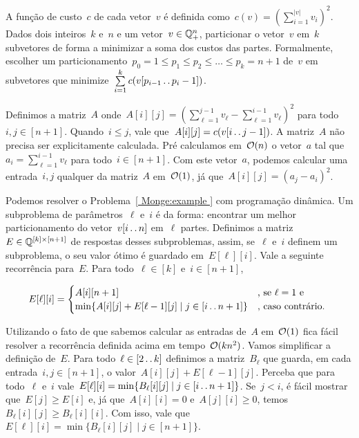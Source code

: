 \begin{prob} \label{ Monge:example }
A função de custo~$c$ de cada vetor~$v$ é definida como~$c(v) = \left( \sum\limits_{i=1}^{|v|} v_i \right)^2$. Dados dois inteiros~$k$ e~$n$ e um vetor~${ v \in \mathbb{Q}^n_+ }$, particionar o vetor~$v$ em~$k$ subvetores de forma a minimizar a soma dos custos das partes. Formalmente, escolher um particionamento~${ p_0 = 1 \leq p_1 \leq p_2 \leq \dots \leq p_k = n+1 }$ de~$v$ em subvetores que minimize~$\sum\limits_{i=1}^k c(v[p_{i-1} \,.\,.\, p_i - 1])$.
\end{prob}

Definimos a matriz~$A$ onde~${ A[i][j] = \left(\sum\limits_{\ell=1}^{j-1} v_\ell - \sum\limits_{\ell=1}^{i-1} v_\ell \right)^2 }$ para todo~${ i,j \in [n+1] }$. Quando~${ i \leq j }$, vale que~${ A[i][j] = c(v[i \,.\,.\, j-1]) }$. A matriz~$A$ não precisa ser explicitamente calculada. Pré calculamos em~$\mathcal{O}(n)$ o vetor~$a$ tal que~${ a_i = \sum_{\ell=1}^{i-1} v_\ell }$ para todo~${ i \in [n+1] }$. Com este vetor~$a$, podemos calcular uma entrada~$i,j$ qualquer da matriz~$A$ em~$\mathcal{O}(1)$, já que~${ A[i][j] = (a_j - a_i)^2 }$.

Podemos resolver o Problema~\ref{ Monge:example } com programação dinâmica. Um subproblema de parâmetros~$\ell$ e~$i$ é da forma: encontrar um melhor particionamento do vetor~${v[i \,.\,.\, n]}$ em~$\ell$ partes. Definimos a matriz~${E \in \mathbb{Q}^{[k] \times [n+1]}}$ de respostas desses subproblemas, assim, se~$\ell$ e~$i$ definem um subproblema, o seu valor ótimo é guardado em~$E[\ell][i]$. Vale a seguinte recorrência para~$E$. Para todo~$\ell \in [k]$ e~$i \in [n+1]$,

\begin{equation*}
E[\ell][i] = \begin{cases}
    A[i][n+1]                                                   & \text{, se } \ell = 1 \text{ e } \\
    \min\{ A[i][j] + E[\ell-1][j] \mid j \in [i \,.\,.\, n+1] \}     & \text{, caso contrário. }
\end{cases}
\end{equation*}

Utilizando o fato de que sabemos calcular as entradas de~$A$ em~$\mathcal{O}(1)$ fica fácil resolver a recorrência definida acima em tempo~${ \mathcal{O}(kn^2) }$. Vamos simplificar a definição de~$E$. Para todo~${ \ell \in [2 \,.\,.\, k] }$ definimos a matriz~$B_\ell$ que guarda, em cada entrada~${ i,j \in [n+1] }$, o valor~${ A[i][j] + E[\ell-1][j] }$. Perceba que para todo~$\ell$ e~$i$ vale~${ E[\ell][i] = \min\{ B_\ell[i][j] \mid j \in [i \,.\,.\, n+1] \}}$. Se~${ j < i }$, é fácil mostrar que~${ E[j] \geq E[i] }$ e, já que~${ A[i][i] = 0 }$ e~${ A[j][i] \geq 0 }$, temos~${ B_\ell[i][j] \geq B_\ell[i][i] }$. Com isso, vale que~${ E[\ell][i] = \min\{ B_\ell[i][j] \mid j \in [n+1] \} }$. 

